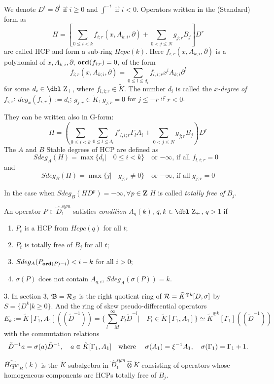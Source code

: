 \documentclass[11pt]{article}
\theoremstyle{definition}
\newcommand{\dz}{{\mbox{\dbl Z}}}
\newcommand{\Ord}{\mathop {\rm \bf ord}}
\theoremstyle{plain}
\numberwithin{equation}{section}
\newcommand{\crr}{{{\cal R}}}
\begin{document}
	 We denote $D^i=\partial^i$ if $i\ge 0$ and $\int^{-i}$ if $i<0$. Operators written in the (Standard) form as 
	$$
	H=[\sum_{0\leq i<k}f_{i;r}(x, A_{k;i}, \partial )+\sum_{0<j\leq N}g_{j;r}B_{j}]D^{r}
	$$
	are called HCP and  form a sub-ring $Hcpc(k)$.   Here $f_{i;r}(x, A_{k;i}, \partial)$ is a polynomial of $x, A_{k;i},\partial$,  $\Ord(f_{i;r})=0$,  of the form
		$$
		f_{i;r}(x, A_{k;i}, \partial )=\sum_{0\leq l\leq d_{i}}f_{l,i;r}x^l A_{k;i}\partial^l
		$$
		for some $d_i\in \dz_+$, where $f_{l,i;r}\in \tilde{K}$. The number  $d_i$ is called the {\it $x$-degree of $f_{i;r}$}:  $deg_{x}(f_{i;r}):= d_i$; $g_{j;r}\in \tilde{K}$, $g_{j;r}=0$ for $j\le -r$ if $r<0$.
	
	
	They can be written also in G-form: 
	$$
	H=(\sum_{0\leq i<k}\sum_{0\leq l\leq d_i} f'_{l,i;r}\Gamma_lA_i+\sum_{0<j\leq N}g_{j;r}B_{j})D^{r}
	$$
	The $A$ and $B$ Stable degrees of HCP are defined as 
	$$
	Sdeg_A(H)=\max \{d_i|\quad 0\leq i<k \} \quad \mbox{or $-\infty$, if all $f_{l,i;r}=0$ } 
	$$
	and 
	$$Sdeg_B(H)=\max\{j|\quad g_{j;r}\neq0\} \quad \mbox{or $-\infty$, if all $g_{j;r}=0$}
	$$
	
	In the case when $Sdeg_B(HD^p)=-\infty,\forall p\in \mathbf{Z}$ $H$ is called {\it totally free of} $B_j$.
	
	An operator $P\in  \hat{D}_1^{sym}$ satisfies {\it condition $A_q(k)$}, $q,k\in \dz_+$, $q>1$ if 
	\begin{enumerate}
		\item
		$P_{t}$ is a HCP  from $Hcpc (q)$  for all $t$;
		\item
		$P_{t}$ is totally free of $B_j$ for all $t$;
		\item
		$Sdeg_A(P_{\Ord (P)-i})< i+k$ for all $i>0$;
		\item
		$\sigma (P)$ does not contain $A_{q;i}$, $Sdeg_A(\sigma (P))=k$.
	\end{enumerate}

3. In section 3, $\mathfrak{B}=\crr_S$ is the right quotient ring of $\crr = \tilde{K}^{\oplus k} [D,\sigma ]$ by $S=\{D^k|k\ge 0\}$. And the ring of skew pseudo-differential operators 
	$$
	E_k:=\tilde{K}[\Gamma_1, A_1]((\tilde{D}^{-1}))=\{\sum_{l=M}^{\infty}P_l\tilde{D}^{-l} | \quad P_l\in \tilde{K}[\Gamma_1, A_1]\} \simeq \tilde{K}^{\oplus k}[\Gamma_1]((\tilde{D}^{-1}))
	$$
with the commutation relations 
$$
\tilde{D}^{-1}a=\sigma (a)\tilde{D}^{-1}, \quad a\in \tilde{K}[\Gamma_1, A_1] \quad \mbox{where \quad }
\sigma (A_1)= \xi^{-1} A_1, \quad \sigma (\Gamma_1)=\Gamma_1+1.
$$	
	
	$\widehat{Hcpc}_B(k)$ is the $\tilde{K}$-subalgebra in $\hat{D}_1^{sym}\hat{\otimes}\tilde{K}$ consisting of operators whose homogeneous components are HCPs totally free of $B_j$. 
	
\end{document}
